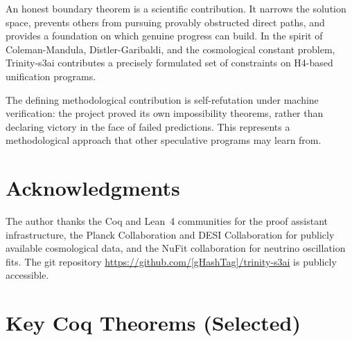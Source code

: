 \documentclass[12pt,a4paper]{article}
\begin{document}
An honest boundary theorem is a scientific contribution. It narrows the solution space,
prevents others from pursuing provably obstructed direct paths, and provides a foundation on which
genuine progress can build. In the spirit of Coleman-Mandula, Distler-Garibaldi, and
the cosmological constant problem, Trinity-s3ai contributes a precisely formulated
set of constraints on H4-based unification programs.

The defining methodological contribution is self-refutation under machine verification:
the project proved its own impossibility theorems, rather than declaring victory in the
face of failed predictions. This represents a methodological approach that other speculative programs may learn from.


\section*{Acknowledgments}

The author thanks the Coq and Lean~4 communities for the proof assistant infrastructure,
the Planck Collaboration and DESI Collaboration for publicly available cosmological data,
and the NuFit collaboration for neutrino oscillation fits. The git repository
\url{https://github.com/[gHashTag]/trinity-s3ai} is publicly accessible.


\printbibliography


\appendix

\section{Key Coq Theorems (Selected)}
\label{app:coq}
\end{document}
